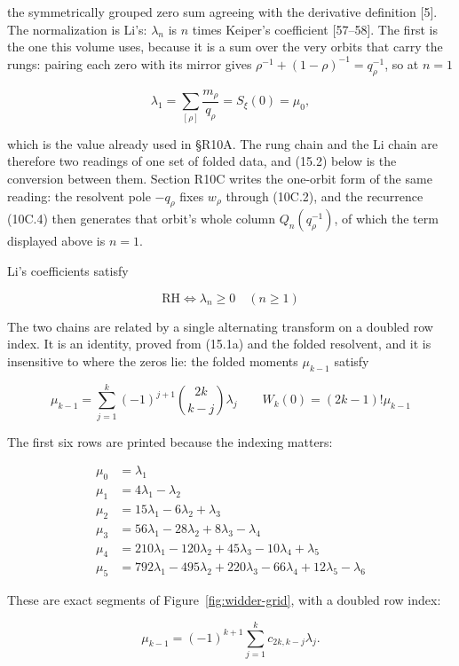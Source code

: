 \documentclass[
  11pt,
]{book}
\newcommand{\figref}[1]{Figure~\ref{#1}}
\begin{document}
the symmetrically grouped zero sum agreeing with the derivative
definition {[}5{]}. The normalization is Li's: \(\lambda_n\) is \(n\)
times Keiper's coefficient {[}57--58{]}. The first is the one this
volume uses, because it is a sum over the very orbits that carry the
rungs: pairing each zero with its mirror gives
\(\rho^{-1}+(1-\rho)^{-1}=q_\rho^{-1}\), so at \(n=1\)

\[
\lambda_1=\sum_{[\rho]}\frac{m_\rho}{q_\rho}=S_\xi(0)=\mu_0,
\tag{15.1b}
\]

which is the value already used in §R10A. The rung chain and the Li
chain are therefore two readings of one set of folded data, and (15.2)
below is the conversion between them. Section R10C writes the one-orbit
form of the same reading: the resolvent pole \(-q_\rho\) fixes
\(w_\rho\) through (10C.2), and the recurrence (10C.4) then generates
that orbit's whole column \(Q_n(q_\rho^{-1})\), of which the term
displayed above is \(n=1\).

Li's coefficients satisfy

\[
\mathrm{RH}\iff\lambda_n\ge0\quad(n\ge1)
\tag{15.1}
\]

The two chains are related by a single alternating transform on a
doubled row index. It is an identity, proved from (15.1a) and the folded
resolvent, and it is insensitive to where the zeros lie: the folded
moments \(\mu_{k-1}\) satisfy

\[
\boxed{
\mu_{k-1}=\sum_{j=1}^k(-1)^{j+1}
\binom{2k}{k-j}\lambda_j
\qquad
W_k(0)=(2k-1)!\mu_{k-1}}
\tag{15.2}
\]

The first six rows are printed because the indexing matters:

\[
\begin{aligned}
\mu_0&=\lambda_1\\
\mu_1&=4\lambda_1-\lambda_2\\
\mu_2&=15\lambda_1-6\lambda_2+\lambda_3\\
\mu_3&=56\lambda_1-28\lambda_2+8\lambda_3-\lambda_4\\
\mu_4&=210\lambda_1-120\lambda_2+45\lambda_3-10\lambda_4+\lambda_5\\
\mu_5&=792\lambda_1-495\lambda_2+220\lambda_3-66\lambda_4
+12\lambda_5-\lambda_6
\end{aligned}
\tag{15.3}
\]

These are exact segments of \figref{fig:widder-grid}, with a doubled row
index:

\[
\mu_{k-1}=(-1)^{k+1}\sum_{j=1}^k c_{2k,k-j}\lambda_j.
\tag{15.3a}
\]
\end{document}
